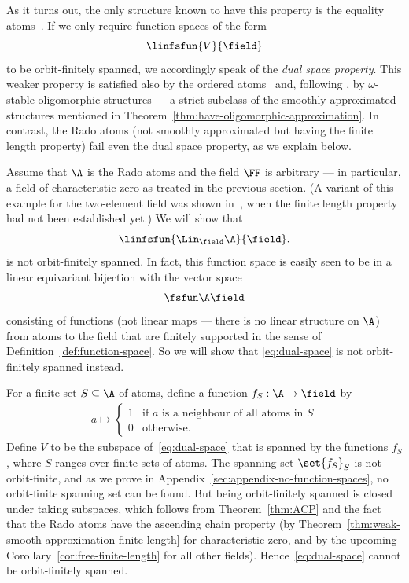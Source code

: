 As it turns out, the only structure known to have this property is the equality atoms~\cite[Thm.~8.16]{bojanczyk_slightly}.
If we only require function spaces of the form \[
    \linfsfun{V}{\field}
\] to be orbit-finitely spanned, we accordingly speak of the \emph{dual space property}. 
This weaker property is satisfied also by the ordered atoms~\cite[Cor.~6.8]{BFKM24} and, following \cite[Thm~3.7]{Przybylek_2024}, by $\omega$-stable oligomorphic structures 
--- a strict subclass \cite[p.~440]{KLM89} of the smoothly approximated structures mentioned in Theorem~\ref{thm:have-oligomorphic-approximation}.
In contrast, the Rado atoms (not smoothly approximated but having the finite length property) fail even the dual space property, as we explain below.


\begin{example}\label{ex:no-function-spaces}
    Assume that $\A$ is the Rado atoms and the field $\FF$ is arbitrary --- in particular, a field of characteristic zero as treated in the previous section.
    (A variant of this example for the two-element field was shown in~\cite[Ex.~6.9]{BFKM24}, when the finite length property had not been established yet.)
    We will show that
    \[
        \linfsfun{\Lin_\field \A}{\field}.
    \]
    is not orbit-finitely spanned.
    In fact, this function space is easily seen to be in a linear equivariant bijection with the vector space
    \begin{align}\label{eq:dual-space}
        \fsfun \A \field
    \end{align}
    consisting of functions (not linear maps --- there is no linear structure on $\A$) from atoms to the field that are finitely supported in the sense of Definition~\ref{def:function-space}.
    So we will show that \eqref{eq:dual-space} is not orbit-finitely spanned instead.
    
    For a finite set $S \subseteq \A$ of atoms, define a function $f_S : \A \to \field$ by
    \begin{align*}
        a \mapsto
        \begin{cases}
            1 & \text{if $a$ is a neighbour of all atoms in $S$}\\
            0 & \text{otherwise}.
        \end{cases}
    \end{align*}
    Define $V$ to be the subspace of~\eqref{eq:dual-space} that is spanned by the functions $f_S$, where $S$ ranges over finite sets of atoms.
    The spanning set $\set{f_S}_S$ is not orbit-finite, and as we prove in Appendix~\ref{sec:appendix-no-function-spaces}, no orbit-finite spanning set can be found. 
    But being orbit-finitely spanned is closed under taking subspaces, which follows from Theorem~\ref{thm:ACP} and the fact that the Rado atoms have the ascending chain property
    (by Theorem~\ref{thm:weak-smooth-approximation-finite-length} for characteristic zero, and by the upcoming Corollary~\ref{cor:free-finite-length} for all other fields). 
    Hence~\eqref{eq:dual-space} cannot be orbit-finitely spanned. 
\lipicsEnd\end{example}
 


